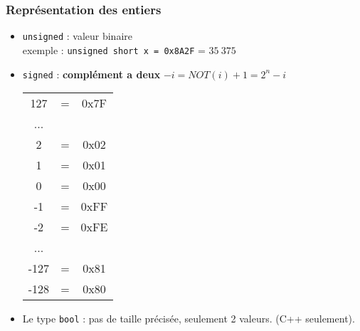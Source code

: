 \documentclass{beamer}
\begin{document}
\begin{frame}
\frametitle{Représentation des entiers}
\begin{itemize}
\item \lstinline+unsigned+ : valeur binaire\\
exemple : \lstinline+unsigned short x = 0x8A2F+ = $35~375$

\item \lstinline+signed+ : \textbf{complément a deux} $ -i  = NOT(i) + 1 = 2^n - i $
 \begin{tabular}{c c c}
 127 & = & 0x7F\\
 ...& & \\
 2 & = & 0x02\\
 1 & = & 0x01\\
 0 & = & 0x00\\
-1 & = & 0xFF\\
-2 & = & 0xFE \\
...& &  \\
-127 & =&  0x81 \\
-128 & =&  0x80
\end{tabular}

\item Le type \lstinline +bool+ : pas de taille précisée, seulement 2 valeurs. (C++ seulement). 

\end{itemize}
\end{frame}
\end{document}
